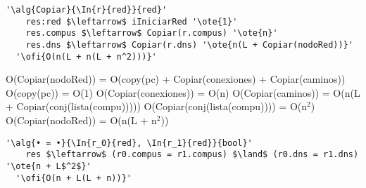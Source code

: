 \begin{lstlisting}[mathescape]
'\alg{Copiar}{\In{r}{red}}{red}'
    res:red $\leftarrow$ iIniciarRed '\ote{1}'
    res.compus $\leftarrow$ Copiar(r.compus) '\ote{n}'
    res.dns $\leftarrow$ Copiar(r.dns) '\ote{n(L + Copiar(nodoRed))}'
  '\ofi{O(n(L + n(L + n^2)))}'
\end{lstlisting}
O(Copiar(nodoRed)) = O(copy(pc) + Copiar(conexiones) + Copiar(caminos)) \newline
O(copy(pc)) = O(1) \newline
O(Copiar(conexiones)) = O(n)\newline
O(Copiar(caminos)) = O(n(L + Copiar(conj(lista(compu))))) \newline
O(Copiar(conj(lista(compu)))) = O(n$^2$) \newline
O(Copiar(nodoRed)) = O(n(L + n$^2$)) \newline

\begin{lstlisting}[mathescape]
'\alg{• = •}{\In{r_0}{red}, \In{r_1}{red}}{bool}'
    res $\leftarrow$ (r0.compus = r1.compus) $\land$ (r0.dns = r1.dns) '\ote{n + L$^2$}'
  '\ofi{O(n + L(L + n))}'
\end{lstlisting}
